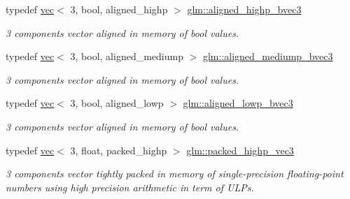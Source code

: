 \begin{DoxyCompactItemize}
\mbox{\label{group__gtc__type__aligned_ga224220a3fc5e5220141a568270cfb405}} 
typedef \hyperlink{structglm_1_1vec}{vec}$<$ 3, bool, aligned\+\_\+highp $>$ \hyperlink{group__gtc__type__aligned_ga224220a3fc5e5220141a568270cfb405}{glm\+::aligned\+\_\+highp\+\_\+bvec3}
\begin{DoxyCompactList}\small\item\em 3 components vector aligned in memory of bool values. \end{DoxyCompactList}\item 
\mbox{\label{group__gtc__type__aligned_ga09e9fbc2d4dd00aa1319255fad4d7209}} 
typedef \hyperlink{structglm_1_1vec}{vec}$<$ 3, bool, aligned\+\_\+mediump $>$ \hyperlink{group__gtc__type__aligned_ga09e9fbc2d4dd00aa1319255fad4d7209}{glm\+::aligned\+\_\+mediump\+\_\+bvec3}
\begin{DoxyCompactList}\small\item\em 3 components vector aligned in memory of bool values. \end{DoxyCompactList}\item 
\mbox{\label{group__gtc__type__aligned_ga83e413f4dd427d7b3fcbb531fce722be}} 
typedef \hyperlink{structglm_1_1vec}{vec}$<$ 3, bool, aligned\+\_\+lowp $>$ \hyperlink{group__gtc__type__aligned_ga83e413f4dd427d7b3fcbb531fce722be}{glm\+::aligned\+\_\+lowp\+\_\+bvec3}
\begin{DoxyCompactList}\small\item\em 3 components vector aligned in memory of bool values. \end{DoxyCompactList}\item 
\mbox{\label{group__gtc__type__aligned_ga6814dd861e658e724ce9e5e673a4486b}} 
typedef \hyperlink{structglm_1_1vec}{vec}$<$ 3, float, packed\+\_\+highp $>$ \hyperlink{group__gtc__type__aligned_ga6814dd861e658e724ce9e5e673a4486b}{glm\+::packed\+\_\+highp\+\_\+vec3}
\begin{DoxyCompactList}\small\item\em 3 components vector tightly packed in memory of single-\/precision floating-\/point numbers using high precision arithmetic in term of U\+L\+Ps. \end{DoxyCompactList}\item 
\mbox{\label{group__gtc__type__aligned_ga34ad82503f637918457284618bef3a82}} 

\end{DoxyCompactItemize}
